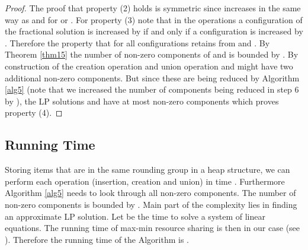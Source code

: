 \documentclass[a4paper,11pt]{article}
\begin{document}
\begin{proof}
	The proof that property (2) holds is symmetric since  increases in the same way as  
	and  for  or .
	For property (3) note that in the operations a configuration  of the fractional solution is increased by  
	if and only
	if a configuration  is increased by . Therefore the property that for all configurations  
	retains from  and . By Theorem \ref{thm15} the number of non-zero components of  and  is bounded 
	by . 
	By construction of the creation operation and union operation  and 
	might have two additional non-zero components. But since these are being reduced by Algorithm \ref{alg5} (note that 
	we increased the number of components being reduced in step 6 by ), the LP solutions  and  
	have at most  non-zero components which proves property (4).
	\end{proof}
\subsection{Running Time}
Storing items that are in the same rounding group in a heap structure, we can perform each operation 
(insertion, creation and union) in time . 
Furthermore Algorithm \ref{alg5} needs to look through all non-zero components. The number of non-zero components is bounded
by .
Main part of the complexity lies in finding an approximate LP solution.
Let  be the time to solve a system of  linear equations. The running time of
max-min resource sharing is then in our case 
(see \cite{jansen2004approximation}).
Therefore the running time of the Algorithm is .
\end{document}
